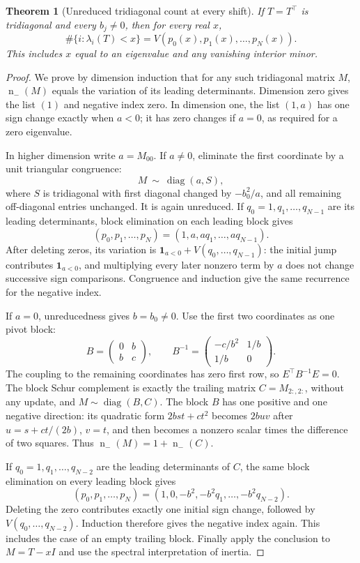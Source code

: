 \documentclass[11pt]{article}
\newcommand{\diag}{\operatorname{diag}}
\newcommand{\negind}{\operatorname{n}_{-}}
\newtheorem{theorem}{Theorem}[section]
\theoremstyle{remark}\newtheorem{remark}[theorem]{Remark}
\numberwithin{equation}{section}
\begin{document}
\begin{theorem}[Unreduced tridiagonal count at every shift]\label{thm:zerosturm}
If $T=T^\top$ is tridiagonal and every $b_j\ne0$, then for every real $x$,
\[
 \#\{i:\lambda_i(T)<x\}=V(p_0(x),p_1(x),\ldots,p_N(x)).
\]
This includes $x$ equal to an eigenvalue and any vanishing interior minor.
\end{theorem}
\begin{proof}
We prove by dimension induction that for any such tridiagonal matrix
$M$, $\negind(M)$ equals the variation of its leading determinants.
Dimension zero gives the list $(1)$ and negative index zero. In
dimension one, the list $(1,a)$ has one sign change exactly when $a<0$;
it has zero changes if $a=0$, as required for a zero eigenvalue.

In higher dimension write $a=M_{00}$. If $a\ne0$, eliminate the first
coordinate by a unit triangular congruence:
\[
 M\ \sim\ \diag(a,S),
\]
where $S$ is tridiagonal with first diagonal changed by $-b_0^2/a$,
and all remaining off-diagonal entries unchanged. It is again unreduced.
If $q_0=1,q_1,\ldots,q_{N-1}$ are its leading determinants, block
elimination on each leading block gives
\[
 (p_0,p_1,\ldots,p_N)=(1,a,aq_1,\ldots,aq_{N-1}).
\]
After deleting zeros, its variation is
$\boldsymbol1_{a<0}+V(q_0,\ldots,q_{N-1})$: the initial jump contributes
$\boldsymbol1_{a<0}$, and multiplying every later nonzero term by $a$
does not change successive sign comparisons. Congruence and induction
give the same recurrence for the negative index.

If $a=0$, unreducedness gives $b=b_0\ne0$. Use the first two coordinates
as one pivot block:
\[
 B=\begin{pmatrix}0&b\\b&c\end{pmatrix},\qquad
 B^{-1}=\begin{pmatrix}-c/b^2&1/b\\1/b&0\end{pmatrix}.
\]
The coupling to the remaining coordinates has zero first row, so
$E^\top B^{-1}E=0$. The block Schur complement is exactly the trailing
matrix $C=M_{2:,2:}$, without any update, and $M\sim\diag(B,C)$.
The block $B$ has one positive and one negative direction: its quadratic
form $2bst+ct^2$ becomes $2buv$ after $u=s+c t/(2b)$, $v=t$, and then
becomes a nonzero scalar times the difference of two squares.
Thus $\negind(M)=1+\negind(C)$.

If $q_0=1,q_1,\ldots,q_{N-2}$ are the leading determinants of $C$, the
same block elimination on every leading block gives
\[
 (p_0,p_1,\ldots,p_N)=(1,0,-b^2,-b^2q_1,\ldots,-b^2q_{N-2}).
\]
Deleting the zero contributes exactly one initial sign change, followed
by $V(q_0,\ldots,q_{N-2})$. Induction therefore gives the negative index
again. This includes the case of an empty trailing block. Finally apply
the conclusion to $M=T-xI$ and use the spectral interpretation of inertia.
\end{proof}
\end{document}
